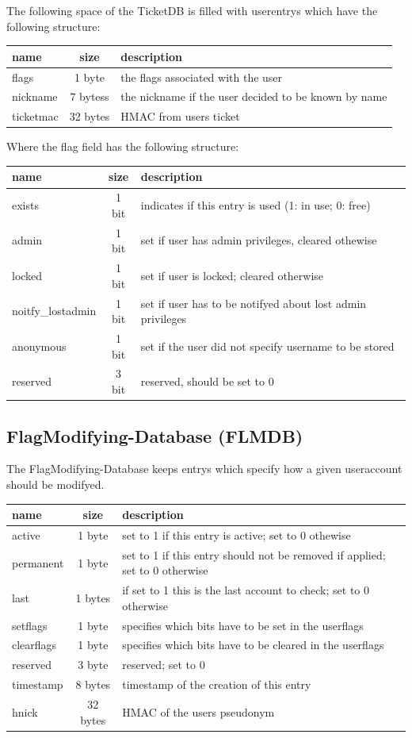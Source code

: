 The following space of the TicketDB is filled with userentrys which have the following structure:\\
\begin{tabular}{|l|c|l|} \hline
name & size & description \\ \hline 
flags         & 1 byte    & the flags associated with the user \\
nickname  & 7 bytess & the nickname if the user decided to be known by name \\
ticketmac  & 32 bytes & HMAC from users ticket \\ \hline
\end{tabular} 

Where the flag field has the following structure: \\
\begin{tabular}{|l|c|l|} \hline
name & size & description \\ \hline 
exists         & 1 bit    &  indicates if this entry is used (1: in use; 0: free)\\
admin  & 1 bit & set if user has admin privileges, cleared othewise \\
locked  & 1 bit & set if user is locked; cleared otherwise \\
noitfy\_lostadmin  & 1 bit & set if user has to be notifyed about lost admin privileges \\
anonymous  & 1 bit & set if the user did not specify username to be stored \\
reserved & 3 bit & reserved, should be set to 0\\ \hline
\end{tabular} 


\subsection{FlagModifying-Database (FLMDB)}
The FlagModifying-Database keeps entrys which specify how a given useraccount should be modifyed. \\
\begin{tabular}{|l|c|l|} \hline
name & size & description \\ \hline 
active          & 1 byte    & set to 1 if this entry is active; set to 0 othewise \\
permanent  & 1 byte & set to 1 if this entry should not be removed if applied; set to 0 otherwise \\
last             & 1 bytes & if set to 1 this is the last account to check; set to 0 otherwise \\ 
setflags       & 1 byte & specifies which bits have to be set in the userflags\\
clearflags    & 1 byte & specifies which bits have to be cleared in the userflags\\
reserved     & 3 byte & reserved; set to 0\\
timestamp  & 8 bytes & timestamp of the creation of this entry\\
hnick          & 32 bytes & HMAC of the users pseudonym\\
\hline
\end{tabular}

